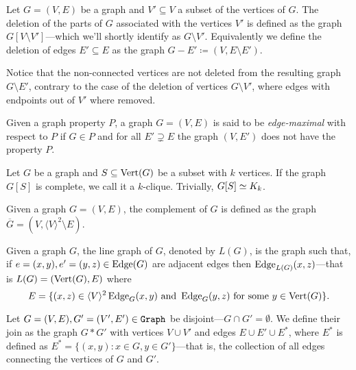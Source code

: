 \begin{definition}
\label{def: deletion-graph}
Let \(G = (V, E)\) be a graph and \(V' \subseteq V\) a subset of the
vertices of \(G\). The deletion of the parts of \(G\) associated with the
vertices \(V'\) is defined as the graph \(G[V \setminus V']\)---which we'll
shortly identify as \(G \setminus V'\). Equivalently we define the deletion
of edges \(E' \subseteq E\) as the graph \(G - E' \coloneq (V, E \setminus E')\).
\end{definition}

Notice that the non-connected vertices are not deleted from the resulting graph
\(G \setminus E'\), contrary to the case of the deletion of vertices \(G
\setminus V'\), where edges with endpoints out of \(V'\) where removed.

\begin{definition}
\label{def: edge-maximal}
Given a graph property \(P\), a graph \(G = (V, E)\) is said to be
\emph{edge-maximal} with respect to \(P\) if \(G \in P\) and for all \(E'
\supsetneq E\) the graph \((V, E')\) does not have the property \(P\).
\end{definition}

\begin{definition}[Clique]\label{def: clique}
Let \(G\) be a graph and \(S \subseteq \operatorname{Vert}(G)\) be a subset with \(k\) vertices.
If the graph \(G[S]\) is complete, we call it a \(k\)-clique. Trivially,
\(G[S] \simeq K_k\).
\end{definition}

\begin{definition}\label{def: complement-graph}
Given a graph \(G = (V, E)\), the complement of \(G\) is defined as the graph
\(\overline G = (V, \langle V \rangle^2 \setminus E)\).
\end{definition}

\begin{definition}\label{def: line-graph}
Given a graph \(G\), the line graph of \(G\), denoted by \(L(G)\), is the
graph such that, if \(e = (x, y), e' = (y, z) \in \operatorname{Edge}(G)\) are adjacent edges
then \(\operatorname{Edge}_{L(G)}(x, z)\)---that is \(L(G) = (\operatorname{Vert}(G), E)\) where
\[
  E = \{(x, z) \in \langle V \rangle^2 \relax \operatorname{Edge}_G(x, y) \text{ and } \operatorname{Edge}_G(y, z)
  \text{ for some } y \in \operatorname{Vert}(G)\}.
\]
\end{definition}

\begin{definition}[Join]\label{def: graph-join}
Let \(G = (V, E), G' = (V', E') \in {\texttt{Graph}}\) be disjoint---\(G \cap G' =
\emptyset\). We define their join as the graph \(G * G'\) with vertices \(V
\cup V'\) and edges \(E \cup E' \cup E^*\), where \(E^*\) is defined as \(E^*
= \{(x, y) \colon x \in G, y \in G'\}\)---that is, the collection of all edges
connecting the vertices of \(G\) and \(G'\).
\end{definition}


